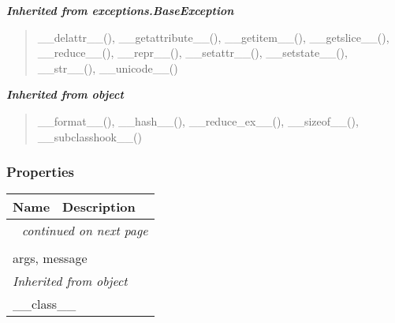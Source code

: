 \large{\textbf{\textit{Inherited from exceptions.BaseException}}}

\begin{quote}
\_\_delattr\_\_(), \_\_getattribute\_\_(), \_\_getitem\_\_(), \_\_getslice\_\_(), \_\_reduce\_\_(), \_\_repr\_\_(), \_\_setattr\_\_(), \_\_setstate\_\_(), \_\_str\_\_(), \_\_unicode\_\_()
\end{quote}

\large{\textbf{\textit{Inherited from object}}}

\begin{quote}
\_\_format\_\_(), \_\_hash\_\_(), \_\_reduce\_ex\_\_(), \_\_sizeof\_\_(), \_\_subclasshook\_\_()
\end{quote}


  \subsubsection{Properties}

    \vspace{-1cm}
\hspace{\varindent}\begin{longtable}{|p{\varnamewidth}|p{\vardescrwidth}|l}
\cline{1-2}
\cline{1-2} \centering \textbf{Name} & \centering \textbf{Description}& \\
\cline{1-2}
\endhead\cline{1-2}\multicolumn{3}{r}{\small\textit{continued on next page}}\\\endfoot\cline{1-2}
\endlastfoot\multicolumn{2}{|l|}{\textit{Inherited from exceptions.BaseException}}\\
\multicolumn{2}{|p{\varwidth}|}{\raggedright args, message}\\
\cline{1-2}
\multicolumn{2}{|l|}{\textit{Inherited from object}}\\
\multicolumn{2}{|p{\varwidth}|}{\raggedright \_\_class\_\_}\\
\cline{1-2}
\end{longtable}

